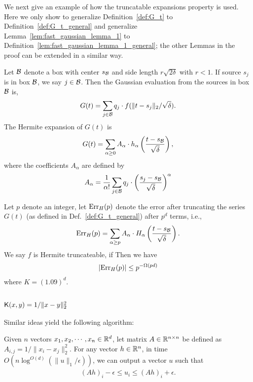 We next give an example of how the truncatable expansions property is used. Here we only show to generalize Definition~\ref{def:G_t} to Definition~\ref{def:G_t_general} and generalize Lemma~\ref{lem:fast_gaussian_lemma_1} to Definition~\ref{lem:fast_gaussian_lemma_1_general}; the other Lemmas in the proof can be extended in a similar way.

\begin{definition}\label{def:G_t_general}
Let ${\cal B}$ denote a box with center $s_{\cal B}$ and side length $r \sqrt{2\delta}$ with $r < 1$.
If source $s_j$ is in box ${\cal B}$, we say $j \in {\cal B}$. Then the Gaussian evaluation from the sources in box ${\cal B}$ is,
\begin{align*}
G(t) = \sum_{j \in {\cal B}} q_j \cdot f( \| t - s_j \|_2 / \sqrt{\delta} ).
\end{align*}
The Hermite expansion of $G(t)$ is 
\begin{align}\label{eq:hermite_expansion_of_G_t_general}
G(t) = \sum_{\alpha \geq 0} A_{\alpha} \cdot h_{\alpha} \left( \frac{ t - s_{\cal B} }{ \sqrt{\delta} } \right),  
\end{align}
where the coefficients $A_{\alpha}$ are defined by
\begin{align}\label{eq:def_A_alpha_general}
A_{\alpha} = \frac{1}{\alpha !} \sum_{j \in {\cal B}} q_j \cdot \left( \frac{ s_j - s_{\cal B} }{ \sqrt{\delta} } \right)^{\alpha} 
\end{align}
\end{definition}

\begin{definition}\label{lem:fast_gaussian_lemma_1_general}
Let $p$ denote an integer, let $\mathrm{Err}_H(p)$ denote the error after truncating the series $G(t)$ (as defined in Def.~\ref{def:G_t_general}) after $p^d$ terms, i.e.,
\begin{align*}
\mathrm{Err}_H(p) = \sum_{\alpha \geq p} A_{\alpha} \cdot H_{\alpha} \left( \frac{t - s_{\cal B}}{ \sqrt{\delta} } \right).
\end{align*}
We say $f$ is Hermite truncateable, if 
 Then we have
\begin{align*}
| \mathrm{Err}_H(p) | \leq p^{-\Omega(pd)}
\end{align*}
where $K = (1.09)^d$.
\end{definition}


\subsection{\texorpdfstring{$\mathsf{K} (x,y) = 1 / \| x - y \|_2^2$}{}}\label{sec:fastmm_other}

Similar ideas yield the following algorithm:
\begin{theorem}\label{thm:fmminverse}
Given $n$ vectors $x_1, x_2, \cdots, x_n \in {\mathbb R}^d$, let matrix $A \in {\mathbb R}^{n \times n}$ be defined as $A_{i,j} = 1 / \| x_i - x_j \|_2^2$. For any vector $h \in {\mathbb R}^n$, in time $O( n \log^{O(d)}( \| u \|_1 /\epsilon) )$, we can output a vector $u$ such that
\begin{align*}
 (A h)_i - \epsilon \leq  u_i \leq  (A h)_i + \epsilon.
\end{align*}
\end{theorem}


